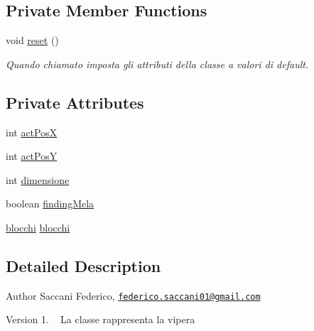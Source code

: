 \subsection*{Private Member Functions}
\begin{DoxyCompactItemize}
\item 
void \mbox{\hyperlink{class_snake_1_1game_1_1vipera_1_1vipera_ad20897c5c8bd47f5d4005989bead0e55}{reset}} ()
\begin{DoxyCompactList}\small\item\em Quando chiamato imposta gli attributi della classe a valori di default. \end{DoxyCompactList}\end{DoxyCompactItemize}
\subsection*{Private Attributes}
\begin{DoxyCompactItemize}
\item 
int \mbox{\hyperlink{class_snake_1_1game_1_1vipera_1_1vipera_aaa64105e6cedf2b98a63e3ab8c8f4cdb}{act\+PosX}}
\item 
int \mbox{\hyperlink{class_snake_1_1game_1_1vipera_1_1vipera_a301b22c6bff25f4530e3f991788338fe}{act\+PosY}}
\item 
int \mbox{\hyperlink{class_snake_1_1game_1_1vipera_1_1vipera_a8ca6a14a9b6b632f309498960d811e42}{dimensione}}
\item 
boolean \mbox{\hyperlink{class_snake_1_1game_1_1vipera_1_1vipera_a6ce986fc0d66eb097e1caeaf211a0f9e}{finding\+Mela}}
\item 
\mbox{\hyperlink{class_snake_1_1game_1_1vipera_1_1blocchi}{blocchi}} \mbox{\hyperlink{class_snake_1_1game_1_1vipera_1_1vipera_a606604546e684baca2f9795a8d418386}{blocchi}}
\end{DoxyCompactItemize}


\subsection{Detailed Description}
\begin{DoxyAuthor}{Author}
Saccani Federico, \href{mailto:federico.saccani01@gmail.com}{\tt federico.\+saccani01@gmail.\+com} 
\end{DoxyAuthor}
\begin{DoxyVersion}{Version}
1. ~\newline
La classe rappresenta la vipera 
\end{DoxyVersion}


